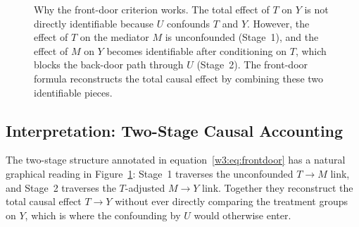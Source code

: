 \documentclass[master.tex]{subfiles}
\begin{document}
\begin{figure}[t]
\centering
{}
\caption{Why the front-door criterion works.  The total effect of $T$ on $Y$
is not directly identifiable because $U$ confounds $T$ and $Y$.  However,
the effect of $T$ on the mediator $M$ is unconfounded (Stage~1), and the
effect of $M$ on $Y$ becomes identifiable after conditioning on $T$, which
blocks the back-door path through $U$ (Stage~2).  The front-door formula
reconstructs the total causal effect by combining these two identifiable
pieces.}
\label{w3:fig:frontdoor-two-stage}
\end{figure}

\subsection{Interpretation: Two-Stage Causal Accounting}
\label{w3:sec:twostage}
The two-stage structure annotated in equation~\eqref{w3:eq:frontdoor} has a
natural graphical reading in Figure~\ref{w3:fig:frontdoor-two-stage}: Stage~1
traverses the unconfounded $T \to M$ link, and Stage~2 traverses the
$T$-adjusted $M \to Y$ link.  Together they reconstruct the total causal
effect $T \to Y$ without ever directly comparing the treatment groups on
$Y$, which is where the confounding by $U$ would otherwise enter.
\end{document}

